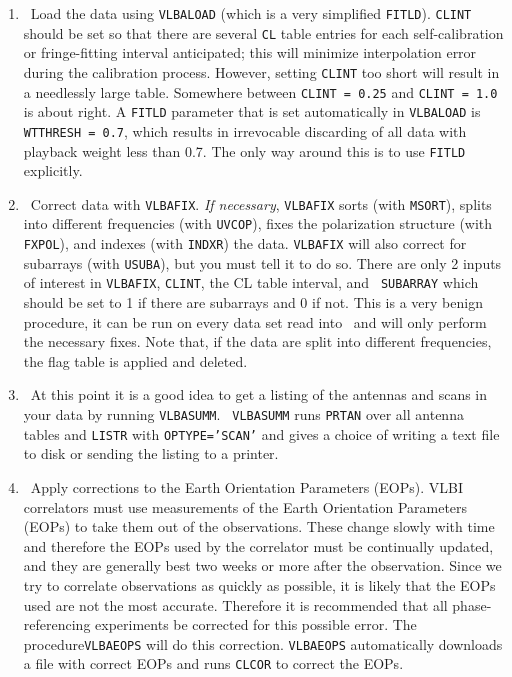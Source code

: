\begin{enumerate}

\item\ {Load the data using {\tt VLBALOAD} (which is a very simplified
{\tt FITLD}).  {\tt CLINT} should be set so that there are several
{\tt CL} table entries for each self-calibration or fringe-fitting
interval anticipated; this will minimize interpolation error during
the calibration process.  However, setting {\tt CLINT} too short will
result in a needlessly large table.  Somewhere between {\tt CLINT =
0.25} and {\tt CLINT = 1.0} is about right.  A {\tt FITLD} parameter
that is set automatically in {\tt VLBALOAD} is {\tt WTTHRESH = 0.7},
which results in irrevocable discarding of all data with playback
weight less than 0.7.  The only way around this is to use {\tt FITLD}
}explicitly.

\item\ Correct data with {\tt VLBAFIX}\@. {\it If
necessary}, {\tt VLBAFIX} sorts (with {\tt MSORT})\@, splits into
different frequencies (with {\tt UVCOP})\@, fixes the polarization
structure (with {\tt FXPOL}), and indexes (with {\tt INDXR}) the data.
{\tt VLBAFIX} will also correct for subarrays (with {\tt USUBA}), but
you must tell it to do so.  There are only 2 inputs of interest in
{\tt VLBAFIX}, {\tt CLINT}\@, the CL table interval, and {\tt
SUBARRAY} which should be set to 1 if there are subarrays and 0 if
not.  This is a very benign procedure, it can be run on
every data set read into \AIPS\ and will only perform the
necessary fixes.  Note that, if the data are split into different
frequencies, the flag table is applied and deleted.

\item\ {At this point it is a good idea to get a listing of the
antennas and scans in your data by running {\tt VLBASUMM}\@.  {\tt
VLBASUMM} runs {\tt PRTAN} over all antenna tables and {\tt LISTR}
with {\tt OPTYPE='SCAN'} and gives a choice of writing a text file to
disk or sending the listing to a printer.
}

\item\ {Apply corrections to the Earth Orientation Parameters (EOPs).
VLBI correlators must use measurements of the Earth Orientation
Parameters (EOPs) to take them out of the observations.  These change
slowly with time and therefore the EOPs used by the correlator must be
continually updated, and they are generally best two weeks or more after
the observation.  Since we try to correlate observations as quickly as
possible, it is likely that the EOPs used are not the most accurate.
Therefore it is recommended that all phase-referencing experiments be
corrected for this possible error.  The procedure{\tt VLBAEOPS} will do
this correction.  {\tt VLBAEOPS} automatically downloads
a file with correct EOPs and runs {\tt CLCOR} to correct the EOPs.}


\end{enumerate}

